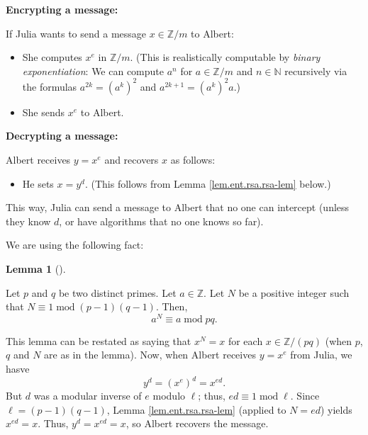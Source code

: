 \documentclass[numbers=enddot,12pt,final,onecolumn,notitlepage]{scrartcl}%
\numberwithin{exer}{subsection}
\theoremstyle{definition}
\newtheorem{lem}[theo]{Lemma}
\newenvironment{lemma}[1][]
{\begin{lem}[#1]\begin{leftbar}}
{\end{leftbar}\end{lem}}
\begin{document}
\textbf{Encrypting a message:}

If Julia wants to send a message $x\in\mathbb{Z}/m$ to Albert:

\begin{itemize}
\item She computes $x^{e}$ in $\mathbb{Z}/m$. (This is realistically
computable by \textit{binary exponentiation}: We can compute $a^{n}$ for
$a\in\mathbb{Z}/m$ and $n\in\mathbb{N}$ recursively via the formulas
$a^{2k}=\left(  a^{k}\right)  ^{2}$ and $a^{2k+1}=\left(  a^{k}\right)  ^{2}a$.)

\item She sends $x^{e}$ to Albert.
\end{itemize}

\textbf{Decrypting a message:}

Albert receives $y=x^{e}$ and recovers $x$ as follows:

\begin{itemize}
\item He sets $x=y^{d}$. (This follows from Lemma \ref{lem.ent.rsa.rsa-lem} below.)
\end{itemize}

This way, Julia can send a message to Albert that no one can intercept (unless
they know $d$, or have algorithms that no one knows so far).

We are using the following fact:

\begin{lemma}
\label{lem.ent.rsa.rsa-lem}Let $p$ and $q$ be two distinct primes. Let
$a\in\mathbb{Z}$. Let $N$ be a positive integer such that $N\equiv
1\operatorname{mod}\left(  p-1\right)  \left(  q-1\right)  $. Then,%
\[
a^{N}\equiv a\operatorname{mod}pq.
\]

\end{lemma}

This lemma can be restated as saying that $x^{N}=x$ for each $x\in
\mathbb{Z}/\left(  pq\right)  $ (when $p$, $q$ and $N$ are as in the lemma).
Now, when Albert receives $y=x^{e}$ from Julia, we hasve%
\[
y^{d}=\left(  x^{e}\right)  ^{d}=x^{ed}.
\]
But $d$ was a modular inverse of $e$ modulo $\ell$; thus, $ed\equiv
1\operatorname{mod}\ell$. Since $\ell=\left(  p-1\right)  \left(  q-1\right)
$, Lemma \ref{lem.ent.rsa.rsa-lem} (applied to $N=ed$) yields $x^{ed}=x$.
Thus, $y^{d}=x^{ed}=x$, so Albert recovers the message.
\end{document}
